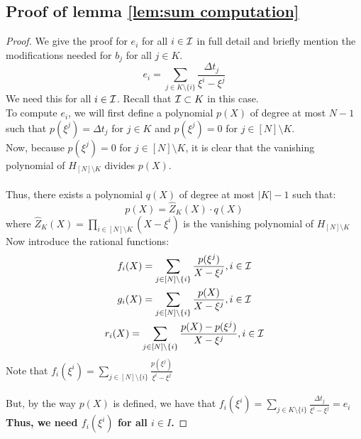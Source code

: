 \subsection{Proof of lemma \ref{lem:sum computation}}

\begin{proof}

    We give the proof for $e_i$ for all $i \in \mathcal{I}$ in full detail and briefly mention the modifications needed for $b_j$ for all $j \in K$. \\

    \begin{equation}\label{eq:ei}
    e_i = \sum_{j\in K\setminus \{i\}} \frac{\Delta t_j}{\xi^i - \xi^j}
    \end{equation}
    We need this for all $i \in \mathcal{I}$. Recall that $\mathcal{I} \subset K$ in this case.\\
    To compute $e_i$, we will first define a polynomial $p(X)$ of degree at most $N-1$ such that
    $p(\xi^j)=\Delta t_j$ for $j\in K$ and $p(\xi^j)=0$ for $j \in [N]\setminus K$.\\
    Now, because $p(\xi^j)=0$ for $j \in [N]\setminus K$, it is clear that the vanishing polynomial of $H_{[N]\setminus K}$ divides $p(X)$.\\\\

    Thus, there exists a polynomial $q(X)$ of degree at most $|K|-1$ such that:
    \begin{equation}\label{eq:px}
    p(X) = \hat{Z}_K(X)\cdot q(X)
    \end{equation}
    where $\hat{Z}_K(X)=\prod_{i\in [N]\setminus K}(X-\xi^i)$ is the vanishing polynomial of $H_{[N]\setminus K}$\\

    Now introduce the rational functions:
    \begin{gather}\label{eq:fgr}
    f_i(X) = \sum_{j\in [N]\setminus \{i\}}\frac{p(\xi^j)}{X-\xi^j}, i\in \mathcal{I} \\
    g_i(X) = \sum_{j\in [N]\setminus \{i\}}\frac{p(X)}{X-\xi^j}, i\in \mathcal{I} \\
    r_i(X) = \sum_{j\in [N]\setminus \{i\}}\frac{p(X) - p(\xi^j)}{X-\xi^j}, i\in \mathcal{I}
    \end{gather}
    Note that $f_i(\xi^i)=\sum_{j\in [N]\setminus \{i\}}\frac{p(\xi^j)}{\xi^i-\xi^j}$\\\\
    But, by the way $p(X)$ is defined, we have that $f_i(\xi^i)=\sum_{j\in K\setminus \{i\}}\frac{\Delta t_j}{\xi^i-\xi^j}=e_i$\\
    \textbf{Thus, we need $f_i(\xi^i)$ for all $i \in I$.}


\end{proof}
